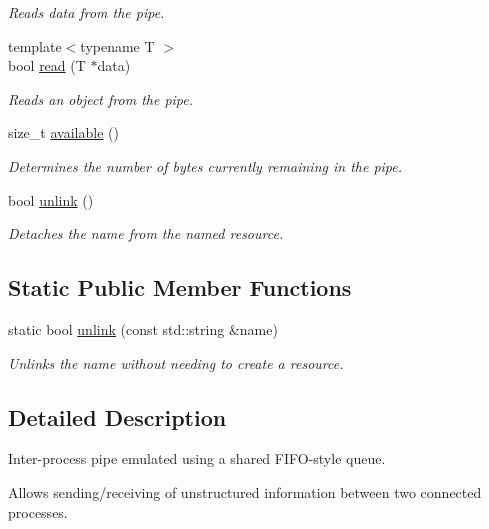 \begin{DoxyCompactItemize}
\begin{DoxyCompactList}\small\item\em Reads data from the pipe. \end{DoxyCompactList}\item 
{\footnotesize template$<$typename T $>$ }\\bool \hyperlink{classcpen333_1_1process_1_1basic__pipe_a61e5b27ee80ba854cbacbfe82b1675e8}{read} (T $\ast$data)
\begin{DoxyCompactList}\small\item\em Reads an object from the pipe. \end{DoxyCompactList}\item 
size\+\_\+t \hyperlink{classcpen333_1_1process_1_1basic__pipe_a409e54ba4fd21f9769105804eb118fae}{available} ()
\begin{DoxyCompactList}\small\item\em Determines the number of bytes currently remaining in the pipe. \end{DoxyCompactList}\item 
bool \hyperlink{classcpen333_1_1process_1_1basic__pipe_a344a8291b20be973ade784922bdf37eb}{unlink} ()
\begin{DoxyCompactList}\small\item\em Detaches the name from the named resource. \end{DoxyCompactList}\end{DoxyCompactItemize}
\subsection*{Static Public Member Functions}
\begin{DoxyCompactItemize}
\item 
static bool \hyperlink{classcpen333_1_1process_1_1basic__pipe_afef75c200701b049e58942210f0d6030}{unlink} (const std\+::string \&name)
\begin{DoxyCompactList}\small\item\em Unlinks the name without needing to create a resource. \end{DoxyCompactList}\end{DoxyCompactItemize}


\subsection{Detailed Description}
Inter-\/process pipe emulated using a shared F\+I\+F\+O-\/style queue. 

Allows sending/receiving of unstructured information between two connected processes. 

